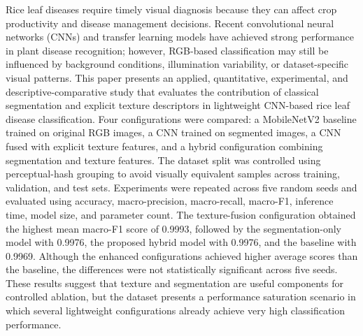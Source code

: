 Rice leaf diseases require timely visual diagnosis because they can affect crop productivity and disease management decisions. Recent convolutional neural networks (CNNs) and transfer learning models have achieved strong performance in plant disease recognition; however, RGB-based classification may still be influenced by background conditions, illumination variability, or dataset-specific visual patterns. This paper presents an applied, quantitative, experimental, and descriptive-comparative study that evaluates the contribution of classical segmentation and explicit texture descriptors in lightweight CNN-based rice leaf disease classification. Four configurations were compared: a MobileNetV2 baseline trained on original RGB images, a CNN trained on segmented images, a CNN fused with explicit texture features, and a hybrid configuration combining segmentation and texture features. The dataset split was controlled using perceptual-hash grouping to avoid visually equivalent samples across training, validation, and test sets. Experiments were repeated across five random seeds and evaluated using accuracy, macro-precision, macro-recall, macro-F1, inference time, model size, and parameter count. The texture-fusion configuration obtained the highest mean macro-F1 score of 0.9993, followed by the segmentation-only model with 0.9976, the proposed hybrid model with 0.9976, and the baseline with 0.9969. Although the enhanced configurations achieved higher average scores than the baseline, the differences were not statistically significant across five seeds. These results suggest that texture and segmentation are useful components for controlled ablation, but the dataset presents a performance saturation scenario in which several lightweight configurations already achieve very high classification performance.